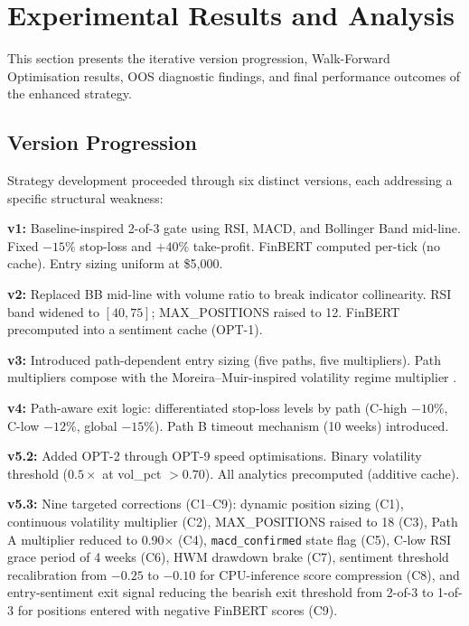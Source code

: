 \documentclass[11pt,twoside,a4paper]{article}
\begin{document}

\section{Experimental Results and Analysis}

This section presents the iterative version progression, Walk-Forward Optimisation results, OOS diagnostic findings, and final performance outcomes of the enhanced strategy.

\subsection{Version Progression}
\label{sec:version-progression}

Strategy development proceeded through six distinct versions, each addressing a specific structural weakness:

\textbf{v1:} Baseline-inspired 2-of-3 gate using RSI, MACD, and Bollinger Band mid-line. Fixed $-15\%$ stop-loss and $+40\%$ take-profit. FinBERT computed per-tick (no cache). Entry sizing uniform at \$5,000.

\textbf{v2:} Replaced BB mid-line with volume ratio to break indicator collinearity. RSI band widened to $[40, 75]$; MAX\_POSITIONS raised to 12. FinBERT precomputed into a sentiment cache (OPT-1).

\textbf{v3:} Introduced path-dependent entry sizing (five paths, five multipliers). Path multipliers compose with the Moreira--Muir-inspired volatility regime multiplier \citep{Moreira2017}.

\textbf{v4:} Path-aware exit logic: differentiated stop-loss levels by path (C-high $-10\%$, C-low $-12\%$, global $-15\%$). Path B timeout mechanism (10 weeks) introduced.

\textbf{v5.2:} Added OPT-2 through OPT-9 speed optimisations. Binary volatility threshold ($0.5\times$ at vol\_pct $> 0.70$). All analytics precomputed (additive cache).

\textbf{v5.3:} Nine targeted corrections (C1--C9): dynamic position sizing (C1), continuous volatility multiplier (C2), MAX\_POSITIONS raised to 18 (C3), Path A multiplier reduced to 0.90$\times$ (C4), \texttt{macd\_confirmed} state flag (C5), C-low RSI grace period of 4 weeks (C6), HWM drawdown brake (C7), sentiment threshold recalibration from $-0.25$ to $-0.10$ for CPU-inference score compression (C8), and entry-sentiment exit signal reducing the bearish exit threshold from 2-of-3 to 1-of-3 for positions entered with negative FinBERT scores (C9).\
\end{document}
